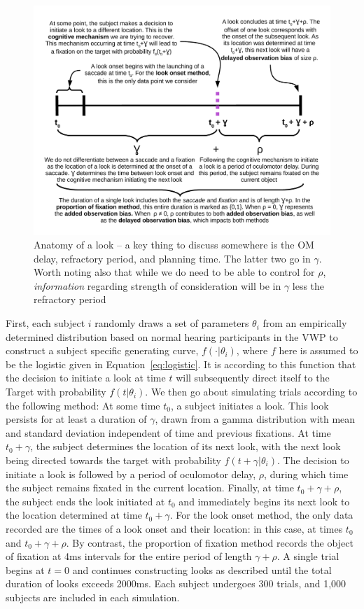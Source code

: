 \documentclass{article}
\begin{document}
\begin{figure}[H]
\centering
\includegraphics[width=\textwidth]{anatomy_of_look.pdf}
\caption{Anatomy of a look -- a key thing to discuss somewhere is the OM delay, refractory period, and planning time. The latter two go in $\gamma$. Worth noting also that while we do need to be able to control for $\rho$, \textit{information} regarding strength of consideration will be in $\gamma$ less the refractory period}
\label{fig:anatomy_of_look}
\end{figure}


First, each subject $i$ randomly draws a set of parameters $\theta_i$ from an empirically determined distribution based on normal hearing participants in the VWP \cite{FarrisTrimble2014} to construct a subject specific generating curve, $f(\cdot | \theta_i)$, where $f$ here is assumed to be the logistic given in Equation~\ref{eq:logistic}.   It is according to this function that the decision to initiate a look at time $t$ will subsequently direct itself to the Target with probability $f(t|\theta_i)$. We then go about simulating trials according to the following method: At some time $t_0$, a subject initiates a look. This look persists for at least a duration of $\gamma$, drawn from a gamma distribution with mean and standard deviation independent of time and previous fixations. At time $t_0+\gamma$, the subject determines the location of its next look, with the next look being directed towards the target with probability $f(t+\gamma | \theta_i)$. The decision to initiate a look is followed by a period of oculomotor delay, $\rho$, during which time the subject remains fixated in the current location. Finally, at time $t_0 + \gamma + \rho$, the subject ends the look initiated at $t_0$ and immediately begins its next look to the location determined at time $t_0 + \gamma$. For the look onset method, the only data recorded are the times of a look onset and their location: in this case, at times $t_0$ and $t_0 + \gamma + \rho$. By contrast, the proportion of fixation method records the object of fixation at 4ms intervals for the entire period of length $\gamma + \rho$. A single trial begins at $t = 0$ and continues constructing looks as described until the total duration of looks exceeds 2000ms. Each subject undergoes 300 trials, and 1,000 subjects are included in each simulation.
\end{document}
